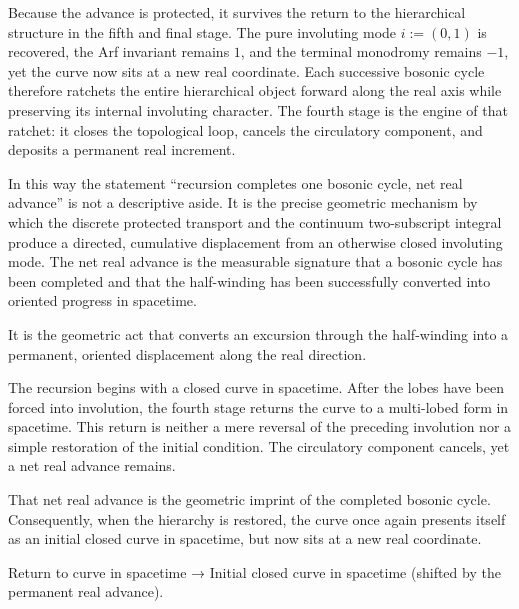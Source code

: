 Because the advance is protected, it survives the return to the hierarchical structure in the fifth and final stage. The pure involuting mode \(i:=(0,1)\) is recovered, the Arf invariant remains \(1\), and the terminal monodromy remains \(-1\), yet the curve now sits at a new real coordinate. Each successive bosonic cycle therefore ratchets the entire hierarchical object forward along the real axis while preserving its internal involuting character. The fourth stage is the engine of that ratchet: it closes the topological loop, cancels the circulatory component, and deposits a permanent real increment.

In this way the statement “recursion completes one bosonic cycle, net real advance” is not a descriptive aside. It is the precise geometric mechanism by which the discrete protected transport and the continuum two-subscript integral produce a directed, cumulative displacement from an otherwise closed involuting mode. The net real advance is the measurable signature that a bosonic cycle has been completed and that the half-winding has been successfully converted into oriented progress in spacetime.

It is the geometric act that converts an excursion through the half-winding into a permanent, oriented displacement along the real direction.

The recursion begins with a closed curve in spacetime. After the lobes have been forced into involution, the fourth stage returns the curve to a multi-lobed form in spacetime. This return is neither a mere reversal of the preceding involution nor a simple restoration of the initial condition. The circulatory component cancels, yet a net real advance remains.  

That net real advance is the geometric imprint of the completed bosonic cycle. Consequently, when the hierarchy is restored, the curve once again presents itself as an initial closed curve in spacetime, but now sits at a new real coordinate.

Return to curve in spacetime → Initial closed curve in spacetime (shifted by the permanent real advance).
